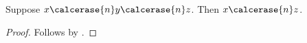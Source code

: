 

\begin{composition}\label{calculation_undetermined_parameter}
    Suppose $x\calcerase{n}y\calcerase{n}z$.
    Then $x\calcerase{n}z$.
\end{composition}
\begin{proof} Follows by . \end{proof}
